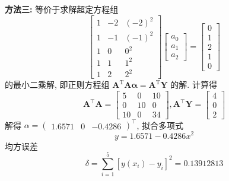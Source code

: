 \begin{tcolorbox}
\textbf{方法三:}
等价于求解超定方程组
$$
\left[\begin{array}{rrr}
1 & -2 & (-2)^{2} \\
1 & -1 & (-1)^{2} \\
1 & 0 & 0^{2} \\
1 & 1 & 1^{2} \\
1 & 2 & 2^{2}
\end{array}\right]\left[\begin{array}{l}
a_{0} \\
a_{1} \\
a_{2}
\end{array}\right]=\left[\begin{array}{l}
0 \\
1 \\
2 \\
1 \\
0
\end{array}\right]
$$
的最小二乘解, 即正则方程组 $ \boldsymbol{A}^{\mathrm{T}} \boldsymbol{A} \boldsymbol{\alpha}=\boldsymbol{A}^{\mathrm{T}} \boldsymbol{Y} $ 的解.
计算得
$$
\boldsymbol{A}^{\top} \boldsymbol{A}=\left[\begin{array}{rrr}
5 & 0 & 10 \\
0 & 10 & 0 \\
10 & 0 & 34
\end{array}\right], \boldsymbol{A}^{\top} \boldsymbol{Y}=\left[\begin{array}{l}
4 \\
0 \\
2
\end{array}\right]
$$
解得 $ \alpha=\left(\begin{array}{lll}1.6571 & 0 & -0.4286\end{array}\right)^{\mathrm{\top}} $, 拟合多项式
$$
y=1.6571-0.4286 x^{2}
$$
均方误差
$$
\delta=\sum_{i=1}^{5}\left[y\left(x_{i}\right)-y_{i}\right]^{2}=0.13912813
$$
\end{tcolorbox}

